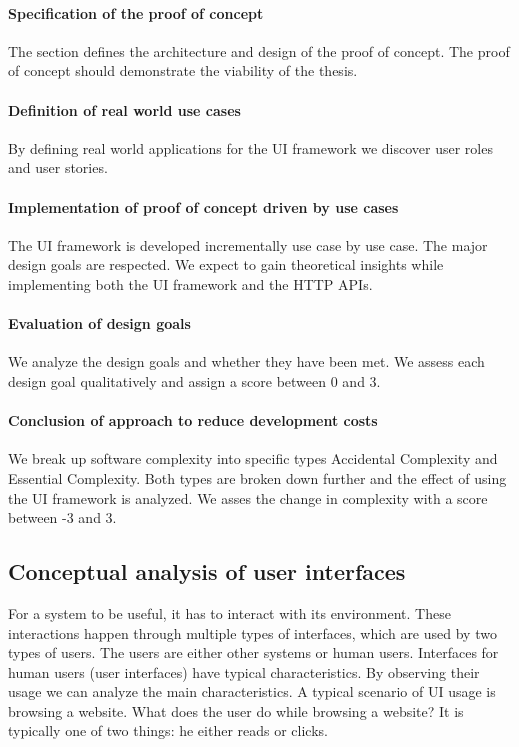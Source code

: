 \paragraph{Specification of the proof of concept}
The section defines the architecture and design of the proof of concept. The proof of concept should demonstrate the viability of the thesis.

\paragraph{Definition of real world use cases}
By defining real world applications for the UI framework we discover user roles and user stories.

\paragraph{Implementation of proof of concept driven by use cases}
The UI framework is developed incrementally use case by use case. The major design goals are respected. We expect to gain theoretical insights while implementing both the UI framework and the HTTP APIs.

\paragraph{Evaluation of design goals}
We analyze the design goals and whether they have been met. We assess each design goal qualitatively and assign a score between 0 and 3.

\paragraph{Conclusion of approach to reduce development costs}
We break up software complexity into specific types Accidental Complexity and Essential Complexity. Both types are broken down further and the effect of using the UI framework is analyzed. We asses the change in complexity with a score between -3 and 3.

\subsection{Conceptual analysis of user interfaces}
For a system to be useful, it has to interact with its environment. These interactions happen through multiple types of interfaces, which are used by two types of users. The users are either other systems or human users.
Interfaces for human users (user interfaces) have typical characteristics. By observing their usage we can analyze the main characteristics. A typical scenario of UI usage is browsing a website. What does the user do while browsing a website? It is typically one of two things: he either reads or clicks.

